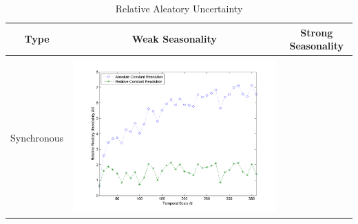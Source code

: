 \documentclass[11pt]{article}
\begin{document}
\begin{table}[H]\small
\caption{Relative Aleatory Uncertainty}
\resizebox{\textwidth}{!}
{
\centering
\begin{tabular}{ccc}
\toprule
Type& Weak Seasonality & Strong Seasonality \\\hline
\\
Synchronous
&\begin{minipage}{.6\textwidth}\includegraphics[width=\linewidth]{resultgraph/05585000AU.png}\end{minipage}


\end{tabular}}
\end{table}
\end{document}
